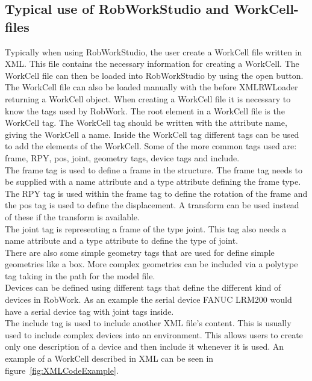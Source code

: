 \subsection{Typical use of RobWorkStudio and WorkCell-files}
Typically when using RobWorkStudio, the user create a WorkCell file written in XML. This file contains the necessary information for creating a WorkCell. The WorkCell file can then be loaded into RobWorkStudio by using the open button. The WorkCell file can also be loaded manually with the before XMLRWLoader returning a WorkCell object. When creating a WorkCell file it is necessary to know the tags used by RobWork. The root element in a WorkCell file is the WorkCell tag. The WorkCell tag should be written with the attribute name, giving the WorkCell a name. Inside the WorkCell tag different tags can be used to add the elements of the WorkCell. Some of the more common tags used are: frame, RPY, pos, joint, geometry tags, device tags and include.\\
The frame tag is used to define a frame in the structure. The frame tag needs to be supplied with a name attribute and a type attribute defining the frame type.\\
The RPY tag is used within the frame tag to define the rotation of the frame and the pos tag is used to define the displacement. A transform can be used instead of these if the transform is available.\\
The joint tag is representing a frame of the type joint. This tag also needs a name attribute and a type attribute to define the type of joint.\\
There are also some simple geometry tags that are used for define simple geometries like a box. More complex geometries can be included via a polytype tag taking in the path for the model file.\\
Devices can be defined using different tags that define the different kind of devices in RobWork. As an example the serial device FANUC LRM200 would have a serial device tag with joint tags inside.\\
The include tag is used to include another XML file's content. This is usually used to include complex devices into an environment. This allows users to create only one description of a device and then include it whenever it is used. An example of a WorkCell described in XML can be seen in figure~\ref{fig:XMLCodeExample}.

